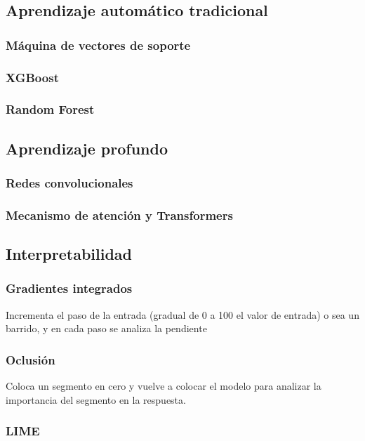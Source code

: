 \subsection{Aprendizaje automático tradicional}
\subsubsection{Máquina de vectores de soporte}
\subsubsection{XGBoost}
\subsubsection{Random Forest}
\subsection{Aprendizaje profundo}
\subsubsection{Redes convolucionales}
\subsubsection{Mecanismo de atención y Transformers}

\subsection{Interpretabilidad}
\subsubsection{Gradientes integrados}
Incrementa el paso de la entrada (gradual de 0 a 100 el valor de entrada) o sea un barrido, y en cada paso se analiza la pendiente
\subsubsection{Oclusión} \label{ssub:xai_oclussion}
Coloca un segmento en cero y vuelve a colocar el modelo para analizar la importancia del segmento en la respuesta.
\subsubsection{LIME}